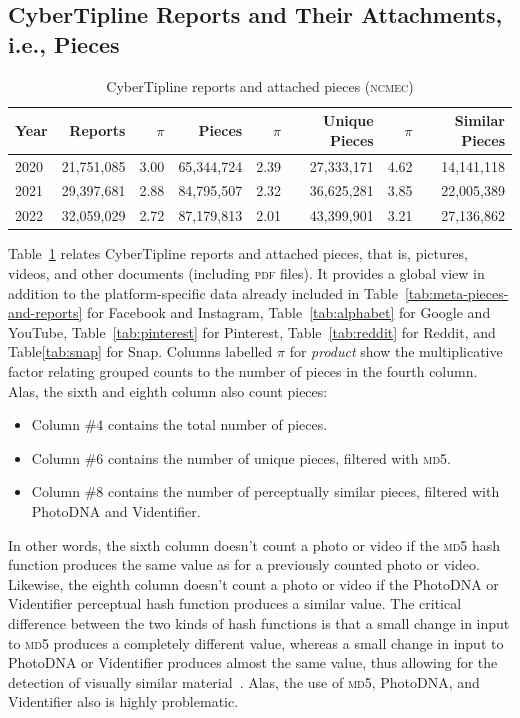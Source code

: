 \documentclass[nonacm,screen]{acmart}
\newcommand\V[1]{\textsc{\MakeLowercase{#1}}}
\begin{document}
\subsection{CyberTipline Reports and Their Attachments, i.e., Pieces}
\label{sec:pieces-and-reports}

\begin{table}
\centering\libertineLF
\caption{CyberTipline reports and attached pieces (\V{NCMEC})}
\label{tab:reports-pieces}
\begin{tabular}{l|rr|r|rr|rr}
\textbf{Year} & \textbf{Reports} & $\pi$ & \textbf{Pieces}
& $\pi$ & \textbf{Unique Pieces} & $\pi$ & \textbf{Similar Pieces} \\ \hline
2020 & 21,751,085 & 3.00 & 65,344,724 & 2.39 & 27,333,171 & 4.62 & 14,141,118 \\
2021 & 29,397,681 & 2.88 & 84,795,507 & 2.32 & 36,625,281 & 3.85 & 22,005,389 \\
2022 & 32,059,029 & 2.72 & 87,179,813 & 2.01 & 43,399,901 & 3.21 & 27,136,862 \\
\end{tabular}
\end{table}

Table~\ref{tab:reports-pieces} relates CyberTipline reports and attached pieces,
that is, pictures, videos, and other documents (including \V{PDF} files). It
provides a global view in addition to the platform-specific data already
included in Table~\ref{tab:meta-pieces-and-reports} for Facebook and Instagram,
Table~\ref{tab:alphabet} for Google and YouTube, Table~\ref{tab:pinterest} for
Pinterest, Table~\ref{tab:reddit} for Reddit, and Table\ref{tab:snap} for Snap.
Columns labelled $\pi$ for \emph{product} show the multiplicative factor
relating grouped counts to the number of pieces in the fourth column. Alas, the
sixth and eighth column also count pieces:
\begin{itemize}
    \item Column \#4 contains the total number of pieces.
    \item Column \#6 contains the number of unique pieces, filtered with \V{MD5}.
    \item Column \#8 contains the number of perceptually similar pieces,
    filtered with PhotoDNA and Videntifier.
\end{itemize}
In other words, the sixth column doesn't count a photo or video if the \V{MD5}
hash function produces the same value as for a previously counted photo or
video. Likewise, the eighth column doesn't count a photo or video if the
PhotoDNA or Videntifier perceptual hash function produces a similar value. The
critical difference between the two kinds of hash functions is that a small
change in input to \V{MD5} produces a completely different value, whereas a
small change in input to PhotoDNA or Videntifier produces almost the same value,
thus allowing for the detection of visually similar material~\cite{Farid2021}.
Alas, the use of \V{MD5}, PhotoDNA, and Videntifier also is highly problematic.
\end{document}
